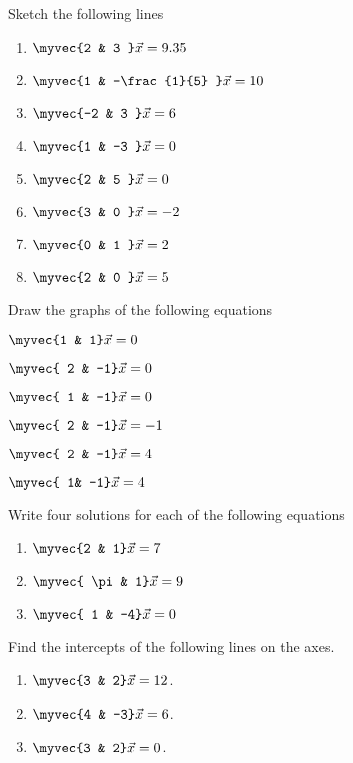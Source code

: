 \item Sketch the following lines
%
\begin{enumerate}[itemsep=2pt]
\item
$
\myvec{2 & 3 }\vec{x}=9.35
$
\item
$
\myvec{1 & -\frac{1}{5} }\vec{x}=10
$
\item
$
\myvec{-2 & 3 }\vec{x}=6
$
\item
$
\myvec{1 & -3 }\vec{x}=0
$
\item
$
\myvec{2 & 5 }\vec{x}=0
$
\item
$
\myvec{3 & 0 }\vec{x}=-2
$
\item
$
\myvec{0 & 1 }\vec{x}=2
$
\item
$
\myvec{2 & 0 }\vec{x}=5
$
\end{enumerate}
%
\solution 

%
\item Draw the graphs of the following equations
\begin{enumerate}[itemsep=2pt]
\begin{multicols}{2}
\item $\myvec{1 & 1}\vec{x} = 0$
\item $\myvec{ 2 & -1}\vec{x}  = 0 $
\item $\myvec{ 1 & -1}\vec{x}  = 0$
\item $\myvec{ 2 & -1}\vec{x}  = -1$
\item $\myvec{ 2 & -1}\vec{x}  = 4$
\item $\myvec{ 1& -1}\vec{x}  = 4$
\end{multicols}
\end{enumerate}
\solution 

%
\item Write four solutions for each of the following equations
\begin{enumerate}
\item $\myvec{2 & 1}\vec{x} = 7$
\item $\myvec{ \pi & 1}\vec{x}  = 9 $
\item $\myvec{ 1 & -4}\vec{x}  = 0$
\end{enumerate}
\solution 

\item Find the intercepts of the following  lines on the axes.
\begin{enumerate}
\item $\myvec{3 & 2}\vec{x} = 12$.
\item $\myvec{4 & -3}\vec{x} = 6$.
\item $\myvec{3 & 2}\vec{x} = 0$.
\end{enumerate}
\solution

%
